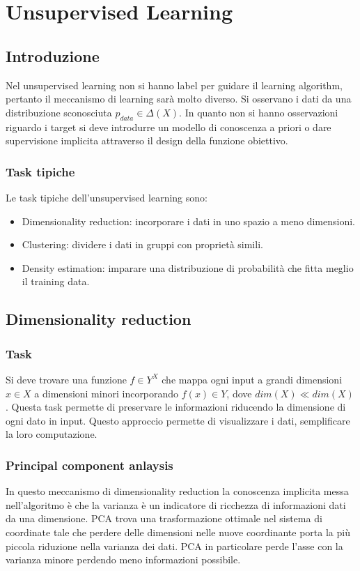 \chapter{Unsupervised Learning}

\section{Introduzione}
Nel unsupervised learning non si hanno label per guidare il learning algorithm, pertanto il meccanismo di learning sar\`a molto diverso.
Si osservano i dati da una distribuzione sconosciuta $p_{data}\in\Delta(X)$.
In quanto non si hanno osservazioni riguardo i target si deve introdurre un modello di conoscenza a priori o dare supervisione implicita attraverso il design della funzione obiettivo.

	\subsection{Task tipiche}
	Le task tipiche dell'unsupervised learning sono:
	\begin{itemize}
		\item Dimensionality reduction: incorporare i dati in uno spazio a meno dimensioni.
		\item Clustering: dividere i dati in gruppi con propriet\`a simili.
		\item Density estimation: imparare una distribuzione di probabilit\`a che fitta meglio il training data.
	\end{itemize}

\section{Dimensionality reduction}

	\subsection{Task}
	Si deve trovare una funzione $f\in Y^X$ che mappa ogni input a grandi dimensioni $x\in X$ a dimensioni minori incorporando $f(x)\in Y$, dove $dim(X)\ll dim(X)$.
	Questa task permette di preservare le informazioni riducendo la dimensione di ogni dato in input.
	Questo approccio permette di visualizzare i dati, semplificare la loro computazione.

	\subsection{Principal component anlaysis}
	In questo meccanismo di dimensionality reduction la conoscenza implicita messa nell'algoritmo \`e che la varianza \`e un indicatore di ricchezza di informazioni dati da una dimensione.
	PCA trova una trasformazione ottimale nel sistema di coordinate tale che perdere delle dimensioni nelle nuove coordinante porta la pi\`u piccola riduzione nella varianza dei dati.
	PCA in particolare  perde l'asse con la varianza minore perdendo meno informazioni possibile.

